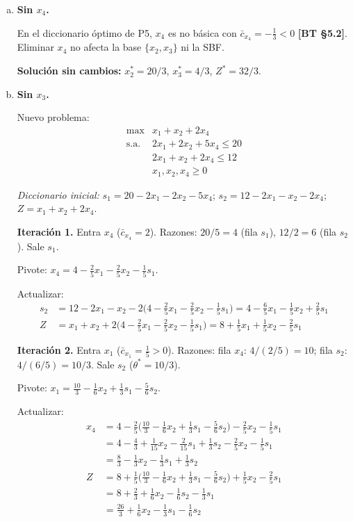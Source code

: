 \documentclass{article}
\begin{document}
\begin{enumerate}[a)]

\item \textbf{Sin $x_4$.}

En el diccionario óptimo de P5, $x_4$ es no básica con $\bar{c}_{x_4} = -\tfrac{1}{3} < 0$ \textbf{[BT §5.2]}. Eliminar $x_4$ no afecta la base $\{x_2, x_3\}$ ni la SBF.

\textbf{Solución sin cambios:} $x_2^* = 20/3$, $x_3^* = 4/3$, $Z^* = 32/3$.

\item \textbf{Sin $x_3$.}

Nuevo problema:
\[
\begin{array}{ll}
\max & x_1 + x_2 + 2x_4 \\
\text{s.a.} & 2x_1 + 2x_2 + 5x_4 \leq 20 \\
& 2x_1 + x_2 + 2x_4 \leq 12 \\
& x_1, x_2, x_4 \geq 0
\end{array}
\]

\textit{Diccionario inicial:} $s_1 = 20 - 2x_1 - 2x_2 - 5x_4$; $s_2 = 12-2x_1-x_2-2x_4$; $Z = x_1+x_2+2x_4$.

\medskip
\textbf{Iteración 1.} Entra $x_4$ ($\bar{c}_{x_4} = 2$). Razones: $20/5=4$ (fila $s_1$), $12/2=6$ (fila $s_2$). Sale $s_1$.

Pivote: $x_4 = 4 - \tfrac{2}{5}x_1 - \tfrac{2}{5}x_2 - \tfrac{1}{5}s_1$.

Actualizar:
\begin{align*}
s_2 &= 12 - 2x_1 - x_2 - 2\bigl(4 - \tfrac{2}{5}x_1 - \tfrac{2}{5}x_2 - \tfrac{1}{5}s_1\bigr) = 4 - \tfrac{6}{5}x_1 - \tfrac{1}{5}x_2 + \tfrac{2}{5}s_1 \\
Z   &= x_1 + x_2 + 2\bigl(4 - \tfrac{2}{5}x_1 - \tfrac{2}{5}x_2 - \tfrac{1}{5}s_1\bigr) = 8 + \tfrac{1}{5}x_1 + \tfrac{1}{5}x_2 - \tfrac{2}{5}s_1
\end{align*}

\medskip
\textbf{Iteración 2.} Entra $x_1$ ($\bar{c}_{x_1} = \tfrac{1}{5} > 0$). Razones: fila $x_4$: $4/(2/5)=10$; fila $s_2$: $4/(6/5)=10/3$. Sale $s_2$ ($\theta^* = 10/3$).

Pivote: $x_1 = \tfrac{10}{3} - \tfrac{1}{6}x_2 + \tfrac{1}{3}s_1 - \tfrac{5}{6}s_2$.

Actualizar:
\begin{align*}
x_4 &= 4 - \tfrac{2}{5}\bigl(\tfrac{10}{3}-\tfrac{1}{6}x_2+\tfrac{1}{3}s_1-\tfrac{5}{6}s_2\bigr) - \tfrac{2}{5}x_2 - \tfrac{1}{5}s_1 \\
    &= 4 - \tfrac{4}{3} + \tfrac{1}{15}x_2 - \tfrac{2}{15}s_1 + \tfrac{1}{3}s_2 - \tfrac{2}{5}x_2 - \tfrac{1}{5}s_1 \\
    &= \tfrac{8}{3} - \tfrac{1}{3}x_2 - \tfrac{1}{3}s_1 + \tfrac{1}{3}s_2 \\
Z   &= 8 + \tfrac{1}{5}\bigl(\tfrac{10}{3}-\tfrac{1}{6}x_2+\tfrac{1}{3}s_1-\tfrac{5}{6}s_2\bigr) + \tfrac{1}{5}x_2 - \tfrac{2}{5}s_1 \\
    &= 8 + \tfrac{2}{3} + \tfrac{1}{6}x_2 - \tfrac{1}{6}s_2 - \tfrac{1}{3}s_1 \\
    &= \tfrac{26}{3} + \tfrac{1}{6}x_2 - \tfrac{1}{3}s_1 - \tfrac{1}{6}s_2
\end{align*}


\end{enumerate}
\end{document}

